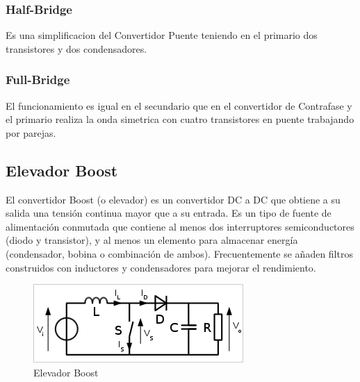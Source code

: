 \documentclass[11pt]{article}
\begin{document}
\subsubsection{Half-Bridge}
Es una simplificacion del Convertidor Puente teniendo en el primario dos transistores y dos condensadores.
\subsubsection{Full-Bridge}
El funcionamiento es igual en el secundario que en el convertidor de Contrafase y el primario realiza la onda simetrica con cuatro transistores en puente trabajando por parejas.


\subsection{Elevador Boost}
El convertidor Boost (o elevador) es un convertidor DC a DC que obtiene a su salida una tensión continua mayor que a su entrada. Es un tipo de fuente de alimentación conmutada que contiene al menos dos interruptores semiconductores (diodo y transistor), y al menos un elemento para almacenar energía (condensador, bobina o combinación de ambos). Frecuentemente se añaden filtros construidos con inductores y condensadores para mejorar el rendimiento. 
\begin{figure}[htp]
\centering
\includegraphics[scale=0.60]{Elevador.png}
\caption{Elevador Boost}
\label{}
\end{figure}
\end{document}
